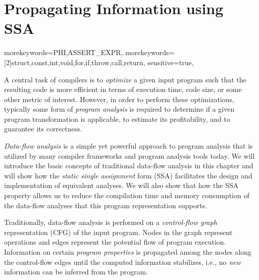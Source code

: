 \providecommand\lcode{\begingroup \small\urlstyle{tt}\Url}
\providecommand\lident{\begingroup \small\urlstyle{tt}\Url}

\chapter{Propagating Information using SSA}
\label{chapter:constant_propagation_is_easier}
\newcommand{\obacht}[2]{\marginpar{\tiny\textbf{#1:} #2}}

{
  morekeywords={PHI,ASSERT_EXPR},
  morekeywords=[2]{struct,const,int,void,for,if,throw,call,return},
  sensitive=true,
}

\lstset{
  mathescape=true,
  language=DNlisting,
  basicstyle=\small,
  keywordstyle=\ttfamily,
  keywordstyle=[2]\bfseries,
  numbers=left
}


A central task of compilers is to \emph{optimize} a given input program such
that the resulting code is more efficient in terms of execution time, code size,
or some other metric of interest. However, in order to perform these
optimizations, typically some form of \emph{program analysis} is
required to determine if a given program transformation is applicable, to
estimate its profitability, and to guarantee its correctness.

\emph{Data-flow analysis} is a simple yet powerful
approach to program analysis that is utilized by many compiler frameworks and
program analysis tools today. We will introduce the basic concepts of
traditional data-flow analysis in this chapter and will show how the \emph{static
single assignment} form (SSA) facilitates the design and implementation of
equivalent analyses.
We will also show that how the SSA property allows us to reduce the compilation
time and memory consumption of the data-flow analyses that this program
representation supports.

Traditionally, data-flow analysis is performed on a \emph{control-flow graph}
representation (CFG) of the input program. Nodes in the graph represent
operations and edges represent the potential flow of program execution.
Information on certain \emph{program properties} is propagated among
the nodes along the control-flow edges until the computed information
stabilizes, i.e., no \emph{new} information can be inferred from the program.

